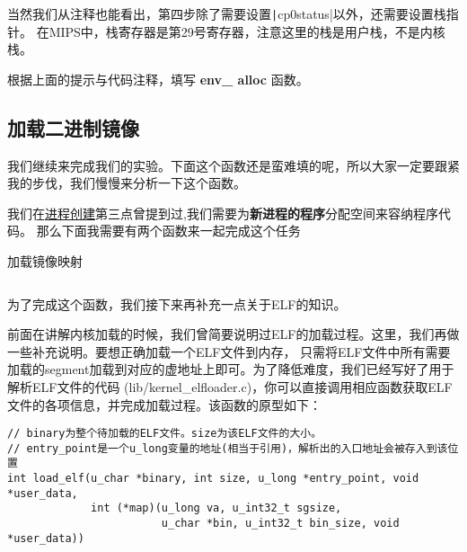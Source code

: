 当然我们从注释也能看出，第四步除了需要设置\texttt|cp0status|以外，还需要设置栈指针。
在MIPS中，栈寄存器是第29号寄存器，注意这里的栈是用户栈，不是内核栈。

\begin{exercise}
根据上面的提示与代码注释，填写 \textbf{env\_ alloc} 函数。
\end{exercise}




\subsection{加载二进制镜像}
我们继续来完成我们的实验。下面这个函数还是蛮难填的呢，所以大家一定要跟紧我的步伐，我们慢慢来分析一下这个函数。

我们在\hyperref[process-3]{进程创建}第三点曾提到过,我们需要为\textbf{新进程的程序}分配空间来容纳程序代码。
那么下面我需要有两个函数来一起完成这个任务

\begin{codeBoxWithCaption}{加载镜像映射\label{code:load_icode_mapper.c}}
  \inputminted[linenos]{c}{codes/load_icode_mapper.c}
\end{codeBoxWithCaption}

为了完成这个函数，我们接下来再补充一点关于ELF的知识。

前面在讲解内核加载的时候，我们曾简要说明过ELF的加载过程。这里，我们再做一些补充说明。要想正确加载一个ELF文件到内存，
只需将ELF文件中所有需要加载的segment加载到对应的虚地址上即可。为了降低难度，我们已经写好了用于解析ELF文件的代码
(lib/kernel\_elfloader.c)，你可以直接调用相应函数获取ELF文件的各项信息，并完成加载过程。该函数的原型如下：

\begin{verbatim}
// binary为整个待加载的ELF文件。size为该ELF文件的大小。
// entry_point是一个u_long变量的地址(相当于引用)，解析出的入口地址会被存入到该位置
int load_elf(u_char *binary, int size, u_long *entry_point, void *user_data,
             int (*map)(u_long va, u_int32_t sgsize,
                        u_char *bin, u_int32_t bin_size, void *user_data))
\end{verbatim}

